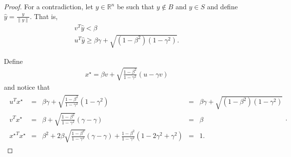 \documentclass{article}
\theoremstyle{case}
\numberwithin{theorem}{subsection}
\newcommand{\Rn}{\mathbb R^n}
\begin{document}
\begin{proof}
For a contradiction, let $y \in \Rn$ be such that $y \not \in B$ and $y \in S$ and define $\hat y = \frac{y}{\|y\|}$.
That is,
\begin{align}
v^T\hat y < \beta \label{csc_vy} \\
u^T\hat y \ge \beta\gamma + \sqrt{\left(1 - \beta^2\right)\left(1 - \gamma^2\right)}. \label{csc_uy}
\end{align}

Define
\begin{align*}
x^{\star} = \beta v + \sqrt{\frac{1 - \beta^2}{1 - \gamma^2}} (u - \gamma v )
\end{align*} and notice that
\begin{align}
\begin{array}{ccccc}
{u}^Tx^{\star} &=& \beta\gamma + \sqrt{\frac{1 - \beta^2}{1 - \gamma^2}} (1 - \gamma^2) &=&  \beta\gamma + \sqrt{\left(1 - \beta^2\right)\left(1 - \gamma^2\right)} \\
{v}^Tx^{\star} &=& \beta + \sqrt{\frac{1 - \beta^2}{1 - \gamma^2}}(\gamma - \gamma) &=& \beta \\
{x^{\star}}^Tx^{\star} &=& \beta^2 + 2\beta\sqrt{\frac{1 - \beta^2}{1 - \gamma^2}}(\gamma - \gamma) + \frac{1 - \beta^2}{1 - \gamma^2} (1- 2\gamma^2 + \gamma^2)&=& 1.
\end{array}. \label{csc_vx_ux}
\end{align}


\end{proof}
\end{document}
